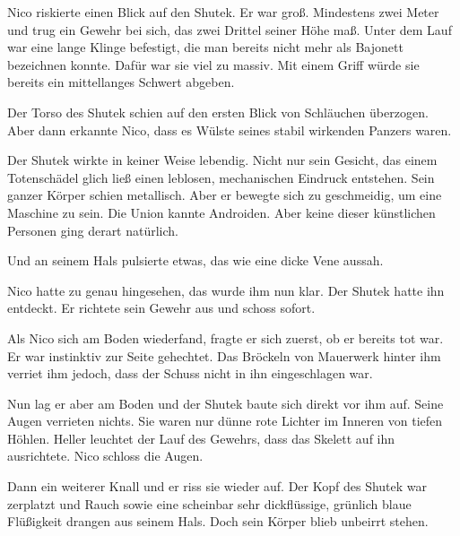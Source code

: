 \par

Nico riskierte einen Blick auf den Shutek. Er war groß. Mindestens zwei Meter und trug ein Gewehr bei sich, das zwei Drittel seiner Höhe maß. Unter dem Lauf war eine lange Klinge befestigt, die man bereits nicht mehr als Bajonett bezeichnen konnte. Dafür war sie viel zu massiv. Mit einem Griff würde sie bereits ein mittellanges Schwert abgeben.

\par

Der Torso des Shutek schien auf den ersten Blick von Schläuchen überzogen. Aber dann erkannte Nico, dass es Wülste seines stabil wirkenden Panzers waren.

\par

Der Shutek wirkte in keiner Weise lebendig. Nicht nur sein Gesicht, das einem Totenschädel glich ließ einen leblosen, mechanischen Eindruck entstehen. Sein ganzer Körper schien metallisch. Aber er bewegte sich zu geschmeidig, um eine Maschine zu sein. Die Union kannte Androiden. Aber keine dieser künstlichen Personen ging derart natürlich.

\par

Und an seinem Hals pulsierte etwas, das wie eine dicke Vene aussah.

\par

Nico hatte zu genau hingesehen, das wurde ihm nun klar. Der Shutek hatte ihn entdeckt. Er richtete sein Gewehr aus und schoss sofort.

\par

Als Nico sich am Boden wiederfand, fragte er sich zuerst, ob er bereits tot war. Er war instinktiv zur Seite gehechtet. Das Bröckeln von Mauerwerk hinter ihm verriet ihm jedoch, dass der Schuss nicht in ihn eingeschlagen war.

\par

Nun lag er aber am Boden und der Shutek baute sich direkt vor ihm auf. Seine Augen verrieten nichts. Sie waren nur dünne rote Lichter im Inneren von tiefen Höhlen. Heller leuchtet der Lauf des Gewehrs, dass das Skelett auf ihn ausrichtete. Nico schloss die Augen.

\par

Dann ein weiterer Knall und er riss sie wieder auf. Der Kopf des Shutek war zerplatzt und Rauch sowie eine scheinbar sehr dickflüssige, grünlich blaue Flüßigkeit drangen aus seinem Hals. Doch sein Körper blieb unbeirrt stehen.

